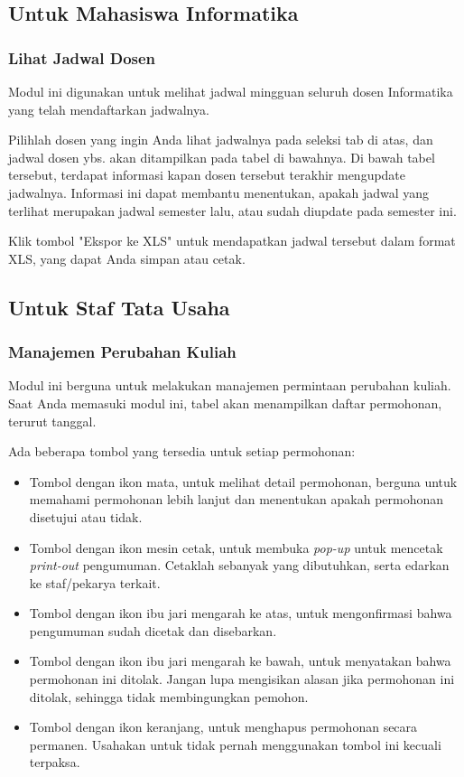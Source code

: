 \subsection{Untuk Mahasiswa Informatika}
\label{sec:bluetape_mahasiswa_informatika}

\subsubsection{Lihat Jadwal Dosen}
\label{sec:bluetape_lihat_jadwal_dosen}

Modul ini digunakan untuk melihat jadwal mingguan seluruh dosen Informatika yang telah mendaftarkan jadwalnya.

Pilihlah dosen yang ingin Anda lihat jadwalnya pada seleksi tab di atas, dan jadwal dosen ybs. akan ditampilkan pada tabel di bawahnya. Di bawah tabel tersebut, terdapat informasi kapan dosen tersebut terakhir mengupdate jadwalnya. Informasi ini dapat membantu menentukan, apakah jadwal yang terlihat merupakan jadwal semester lalu, atau sudah diupdate pada semester ini.

Klik tombol "Ekspor ke XLS" untuk mendapatkan jadwal tersebut dalam format XLS, yang dapat Anda simpan atau cetak.

\subsection{Untuk Staf Tata Usaha}
\label{sec:bluetape_staf_tata_usaha}

\subsubsection{Manajemen Perubahan Kuliah}
\label{sec:bluetape_manajemen_perubahan_kuliah}
Modul ini berguna untuk melakukan manajemen permintaan perubahan kuliah. Saat Anda memasuki modul ini, tabel akan menampilkan daftar permohonan, terurut tanggal.

Ada beberapa tombol yang tersedia untuk setiap permohonan:
\begin{itemize}
	\item Tombol dengan ikon mata, untuk melihat detail permohonan, berguna untuk memahami permohonan lebih lanjut dan menentukan apakah permohonan disetujui atau tidak.
	\item Tombol dengan ikon mesin cetak, untuk membuka \textit{pop-up} untuk mencetak \textit{print-out} pengumuman. Cetaklah sebanyak yang dibutuhkan, serta edarkan ke staf/pekarya terkait.
	\item Tombol dengan ikon ibu jari mengarah ke atas, untuk mengonfirmasi bahwa pengumuman sudah dicetak dan disebarkan.
	\item Tombol dengan ikon ibu jari mengarah ke bawah, untuk menyatakan bahwa permohonan ini ditolak. Jangan lupa mengisikan alasan jika permohonan ini ditolak, sehingga tidak membingungkan pemohon.
	\item Tombol dengan ikon keranjang, untuk menghapus permohonan secara permanen. Usahakan untuk tidak pernah menggunakan tombol ini kecuali terpaksa.
\end{itemize}

